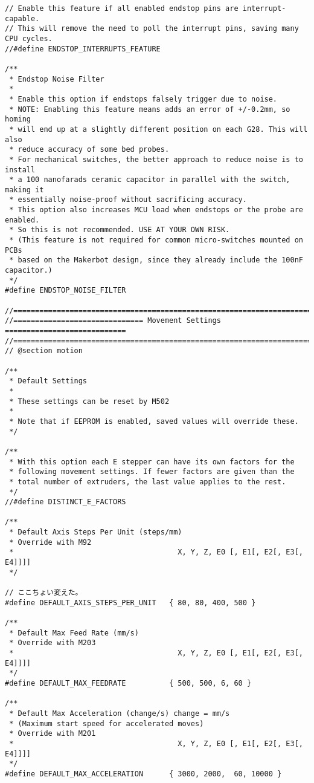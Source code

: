 \begin{lstlisting}[caption = キャプション, label = ラベル]
// Enable this feature if all enabled endstop pins are interrupt-capable.
// This will remove the need to poll the interrupt pins, saving many CPU cycles.
//#define ENDSTOP_INTERRUPTS_FEATURE

/**
 * Endstop Noise Filter
 *
 * Enable this option if endstops falsely trigger due to noise.
 * NOTE: Enabling this feature means adds an error of +/-0.2mm, so homing
 * will end up at a slightly different position on each G28. This will also
 * reduce accuracy of some bed probes.
 * For mechanical switches, the better approach to reduce noise is to install
 * a 100 nanofarads ceramic capacitor in parallel with the switch, making it
 * essentially noise-proof without sacrificing accuracy.
 * This option also increases MCU load when endstops or the probe are enabled.
 * So this is not recommended. USE AT YOUR OWN RISK.
 * (This feature is not required for common micro-switches mounted on PCBs
 * based on the Makerbot design, since they already include the 100nF capacitor.)
 */
#define ENDSTOP_NOISE_FILTER

//=============================================================================
//============================== Movement Settings ============================
//=============================================================================
// @section motion

/**
 * Default Settings
 *
 * These settings can be reset by M502
 *
 * Note that if EEPROM is enabled, saved values will override these.
 */

/**
 * With this option each E stepper can have its own factors for the
 * following movement settings. If fewer factors are given than the
 * total number of extruders, the last value applies to the rest.
 */
//#define DISTINCT_E_FACTORS

/**
 * Default Axis Steps Per Unit (steps/mm)
 * Override with M92
 *                                      X, Y, Z, E0 [, E1[, E2[, E3[, E4]]]]
 */

// ここちょい変えた。
#define DEFAULT_AXIS_STEPS_PER_UNIT   { 80, 80, 400, 500 }

/**
 * Default Max Feed Rate (mm/s)
 * Override with M203
 *                                      X, Y, Z, E0 [, E1[, E2[, E3[, E4]]]]
 */
#define DEFAULT_MAX_FEEDRATE          { 500, 500, 6, 60 }

/**
 * Default Max Acceleration (change/s) change = mm/s
 * (Maximum start speed for accelerated moves)
 * Override with M201
 *                                      X, Y, Z, E0 [, E1[, E2[, E3[, E4]]]]
 */
#define DEFAULT_MAX_ACCELERATION      { 3000, 2000,  60, 10000 }


\end{lstlisting}
